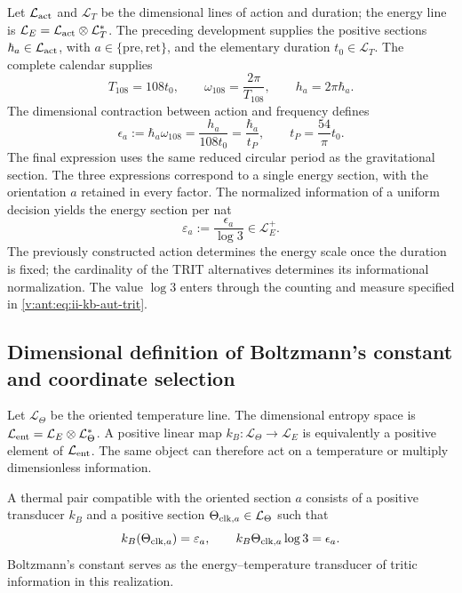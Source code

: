 Let \(\mathcal L_{\rm act}\) and \(\mathcal L_T\) be the
dimensional lines of action and duration; the energy line is
\(\mathcal L_E=\mathcal L_{\rm act}\otimes\mathcal L_T^*\).
The preceding development supplies the positive sections
\(\hbar_a\in\mathcal L_{\rm act}\), with
\(a\in\{\mathrm{pre},\mathrm{ret}\}\), and the elementary duration
\(t_0\in\mathcal L_T\). The complete calendar supplies
\[
 T_{108}=108t_0,\qquad
 \omega_{108}=\frac{2\pi}{T_{108}},\qquad
 h_a=2\pi\hbar_a.
\]
The dimensional contraction between action and frequency defines
\begin{equation}
 \epsilon_a:=\hbar_a\omega_{108}
 =\frac{h_a}{108t_0}
 =\frac{\hbar_a}{t_P},\qquad
 t_P=\frac{54}{\pi}t_0.
 \label{v:ant:eq:ii-kb-aut-energia}
\end{equation}
The final expression uses the same reduced circular period as the
gravitational section. The three expressions correspond to a single
energy section, with the orientation \(a\) retained in every
factor. The normalized information of a uniform decision
yields the energy section per nat
\begin{equation}
 \varepsilon_a:=\frac{\epsilon_a}{\log3}\in\mathcal L_E^+.
 \label{v:ant:eq:ii-kb-aut-energia-nat}
\end{equation}
The previously constructed action determines the energy scale once
the duration is fixed; the cardinality of the TRIT alternatives determines its
informational normalization. The value \(\log3\) enters through the
counting and measure specified in \eqref{v:ant:eq:ii-kb-aut-trit}.

\subsection{Dimensional definition of Boltzmann's constant and coordinate selection}

Let \(\mathcal L_\Theta\) be the oriented temperature line.
The dimensional entropy space is
\(\mathcal L_{\rm ent}=\mathcal L_E\otimes\mathcal L_\Theta^*\).
A positive linear map
\(k_B:\mathcal L_\Theta\to\mathcal L_E\) is equivalently
a positive element of \(\mathcal L_{\rm ent}\). The same
object can therefore act on a temperature or multiply dimensionless
information.

\begin{definition}
A thermal pair compatible with the oriented section \(a\) consists of
a positive transducer \(k_B\) and a positive section
\(\Theta_{{\rm clk},a}\in\mathcal L_\Theta\) such that
\begin{equation}
 k_B(\Theta_{{\rm clk},a})=\varepsilon_a,
 \qquad
 k_B\Theta_{{\rm clk},a}\log3=\epsilon_a.
 \label{v:ant:eq:ii-kb-aut-par-termico}
\end{equation}
Boltzmann's constant serves as the energy--temperature
transducer of tritic information in this realization.
\end{definition}

